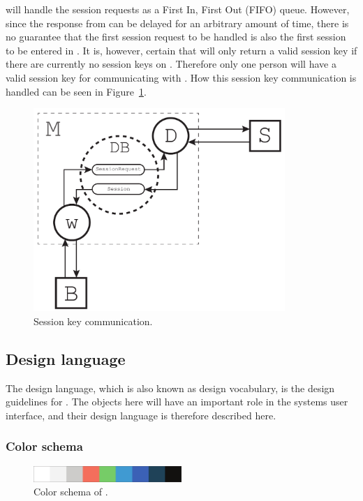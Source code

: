  will handle the session requests as a First In, First Out (FIFO) queue.
However, since the response from  can be delayed for an arbitrary amount of time, there is no guarantee that the first session request to be handled is also the first session to be entered in .
It is, however, certain that  will only return a valid session key if there are currently no session keys on .
Therefore only one person will have a valid session key for communicating with .
How this session key communication is handled can be seen in Figure~\ref{fig:sessionkey_communication_b}.

\begin{figure}[htb]
    \centering
    \includegraphics[width=0.85\textwidth]{gfx/sessionkey_communication_b.pdf}
    \caption{Session key communication.}
    \label{fig:sessionkey_communication_b}
\end{figure}

\subsection{Design language}
The design language, which is also known as design vocabulary, is the design guidelines for \projectname{}.
The objects here will have an important role in the systems user interface, and their design language is therefore described here.

\subsubsection{Color schema}
\begin{figure}[htb]
    \centering
    \includegraphics[width=0.5\textwidth]{gfx/color_schema.pdf}
    \caption{Color schema of \projectname{}.}
    \label{fig:color_schema}
\end{figure}


